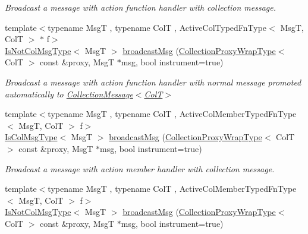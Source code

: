\begin{DoxyCompactItemize}
\begin{DoxyCompactList}\small\item\em Broadcast a message with action function handler with collection message. \end{DoxyCompactList}\item 
{\footnotesize template$<$typename MsgT , typename ColT , Active\+Col\+Typed\+Fn\+Type$<$ Msg\+T, Col\+T $>$ $\ast$ f$>$ }\\\hyperlink{structvt_1_1vrt_1_1collection_1_1_collection_manager_ae376deeefd4f89a0b1c93849977715d9}{Is\+Not\+Col\+Msg\+Type}$<$ MsgT $>$ \hyperlink{structvt_1_1vrt_1_1collection_1_1_collection_manager_a0aa73c7acf95f668330d9c31ce12b581}{broadcast\+Msg} (\hyperlink{structvt_1_1vrt_1_1collection_1_1_collection_manager_a56458ed7f9bb22b631b9b3a745f42f94}{Collection\+Proxy\+Wrap\+Type}$<$ ColT $>$ const \&proxy, MsgT $\ast$msg, bool instrument=true)
\begin{DoxyCompactList}\small\item\em Broadcast a message with action function handler with normal message promoted automatically to {\ttfamily \hyperlink{structvt_1_1vrt_1_1collection_1_1_collection_message}{Collection\+Message$<$\+Col\+T$>$}} \end{DoxyCompactList}\item 
{\footnotesize template$<$typename MsgT , typename ColT , Active\+Col\+Member\+Typed\+Fn\+Type$<$ Msg\+T, Col\+T $>$ f$>$ }\\\hyperlink{structvt_1_1vrt_1_1collection_1_1_collection_manager_a21c21612c806016788057aeab142af20}{Is\+Col\+Msg\+Type}$<$ MsgT $>$ \hyperlink{structvt_1_1vrt_1_1collection_1_1_collection_manager_a5ec1684e67f1e5aec6b94cdcf17e5777}{broadcast\+Msg} (\hyperlink{structvt_1_1vrt_1_1collection_1_1_collection_manager_a56458ed7f9bb22b631b9b3a745f42f94}{Collection\+Proxy\+Wrap\+Type}$<$ ColT $>$ const \&proxy, MsgT $\ast$msg, bool instrument=true)
\begin{DoxyCompactList}\small\item\em Broadcast a message with action member handler with collection message. \end{DoxyCompactList}\item 
{\footnotesize template$<$typename MsgT , typename ColT , Active\+Col\+Member\+Typed\+Fn\+Type$<$ Msg\+T, Col\+T $>$ f$>$ }\\\hyperlink{structvt_1_1vrt_1_1collection_1_1_collection_manager_ae376deeefd4f89a0b1c93849977715d9}{Is\+Not\+Col\+Msg\+Type}$<$ MsgT $>$ \hyperlink{structvt_1_1vrt_1_1collection_1_1_collection_manager_a42cfab20eec557ba82f70d90afa3e7a1}{broadcast\+Msg} (\hyperlink{structvt_1_1vrt_1_1collection_1_1_collection_manager_a56458ed7f9bb22b631b9b3a745f42f94}{Collection\+Proxy\+Wrap\+Type}$<$ ColT $>$ const \&proxy, MsgT $\ast$msg, bool instrument=true)

\end{DoxyCompactItemize}
